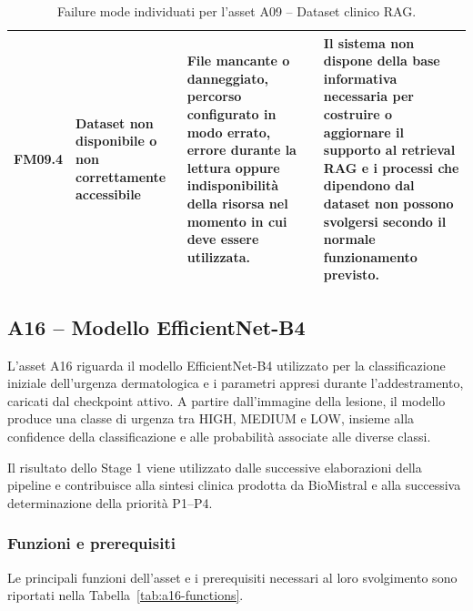 \begin{table}[H]
\begin{tabularx}{\textwidth}{
        >{\raggedright\arraybackslash}p{1.1cm}
        >{\raggedright\arraybackslash}p{3cm}
        >{\raggedright\arraybackslash}p{5cm}
        X
    }
        \midrule

        FM09.4 &
        Dataset non disponibile o non correttamente accessibile &
        File mancante o danneggiato, percorso configurato in modo errato,
        errore durante la lettura oppure indisponibilità della risorsa
        nel momento in cui deve essere utilizzata. &
        Il sistema non dispone della base informativa necessaria per
        costruire o aggiornare il supporto al retrieval RAG e i processi
        che dipendono dal dataset non possono svolgersi secondo il normale
        funzionamento previsto. \\

        \bottomrule
    \end{tabularx}

    \caption{Failure mode individuati per l'asset A09 -- Dataset clinico RAG.}
    \label{tab:a09-failure-modes}
\end{table}
\subsection{A16 -- Modello EfficientNet-B4}

L'asset A16 riguarda il modello EfficientNet-B4 utilizzato per la
classificazione iniziale dell'urgenza dermatologica e i parametri appresi
durante l'addestramento, caricati dal checkpoint attivo. A partire
dall'immagine della lesione, il modello produce una classe di urgenza
tra HIGH, MEDIUM e LOW, insieme alla confidence della classificazione e
alle probabilità associate alle diverse classi.

Il risultato dello Stage 1 viene utilizzato dalle successive elaborazioni
della pipeline e contribuisce alla sintesi clinica prodotta da BioMistral
e alla successiva determinazione della priorità P1--P4.


\subsubsection{Funzioni e prerequisiti}

Le principali funzioni dell'asset e i prerequisiti necessari al loro
svolgimento sono riportati nella Tabella~\ref{tab:a16-functions}.

